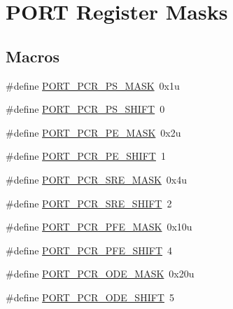 \hypertarget{group___p_o_r_t___register___masks}{}\section{P\+O\+RT Register Masks}
\label{group___p_o_r_t___register___masks}
\subsection*{Macros}
\begin{DoxyCompactItemize}
\item 
\#define \hyperlink{group___p_o_r_t___register___masks_ga075e53298ec26cb1b463c95b902c39c1}{P\+O\+R\+T\+\_\+\+P\+C\+R\+\_\+\+P\+S\+\_\+\+M\+A\+SK}~0x1u
\item 
\#define \hyperlink{group___p_o_r_t___register___masks_ga7c040fa4d37750af5fef3ea1d0e370a9}{P\+O\+R\+T\+\_\+\+P\+C\+R\+\_\+\+P\+S\+\_\+\+S\+H\+I\+FT}~0
\item 
\#define \hyperlink{group___p_o_r_t___register___masks_ga125482aa2497e8435dac49c039b7fa97}{P\+O\+R\+T\+\_\+\+P\+C\+R\+\_\+\+P\+E\+\_\+\+M\+A\+SK}~0x2u
\item 
\#define \hyperlink{group___p_o_r_t___register___masks_ga18556773988cdd78e363959884dbec46}{P\+O\+R\+T\+\_\+\+P\+C\+R\+\_\+\+P\+E\+\_\+\+S\+H\+I\+FT}~1
\item 
\#define \hyperlink{group___p_o_r_t___register___masks_ga9cdf02a7b160ee528de8e18aad2cae60}{P\+O\+R\+T\+\_\+\+P\+C\+R\+\_\+\+S\+R\+E\+\_\+\+M\+A\+SK}~0x4u
\item 
\#define \hyperlink{group___p_o_r_t___register___masks_ga87657ecdc18eb5b344d4e399a3a2fb70}{P\+O\+R\+T\+\_\+\+P\+C\+R\+\_\+\+S\+R\+E\+\_\+\+S\+H\+I\+FT}~2
\item 
\#define \hyperlink{group___p_o_r_t___register___masks_ga7f1f5c3812018f9ed4d84a187146ba91}{P\+O\+R\+T\+\_\+\+P\+C\+R\+\_\+\+P\+F\+E\+\_\+\+M\+A\+SK}~0x10u
\item 
\#define \hyperlink{group___p_o_r_t___register___masks_gae7d057ebd3218784fca57f55a85f2d29}{P\+O\+R\+T\+\_\+\+P\+C\+R\+\_\+\+P\+F\+E\+\_\+\+S\+H\+I\+FT}~4
\item 
\#define \hyperlink{group___p_o_r_t___register___masks_gacbe19f0087a51a8c26c51838b7a555d2}{P\+O\+R\+T\+\_\+\+P\+C\+R\+\_\+\+O\+D\+E\+\_\+\+M\+A\+SK}~0x20u
\item 
\#define \hyperlink{group___p_o_r_t___register___masks_gac4871a3c3a20a51a3a57131d34e427e0}{P\+O\+R\+T\+\_\+\+P\+C\+R\+\_\+\+O\+D\+E\+\_\+\+S\+H\+I\+FT}~5
\item 

\end{DoxyCompactItemize}
